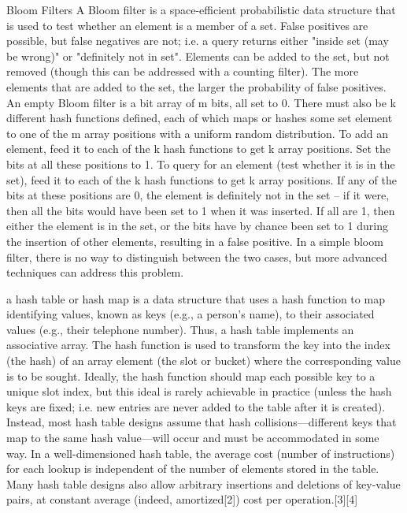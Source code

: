 Bloom Filters
A Bloom filter is a space-efficient probabilistic data structure that is used to test whether an element
is a member of a set. False positives are possible, but false negatives are not; i.e. a query returns either "inside set (may be wrong)"
or "definitely not in set". Elements can be added to the set, but not removed (though this can be addressed with a counting filter).
The more elements that are added to the set, the larger the probability of false positives.
An empty Bloom filter is a bit array of m bits, all set to 0. There must also be k different hash functions defined, each of which maps or hashes some set element to one of the m array positions with a uniform random distribution.
To add an element, feed it to each of the k hash functions to get k array positions. Set the bits at all these positions to 1.
To query for an element (test whether it is in the set), feed it to each of the k hash functions to get k array positions.
If any of the bits at these positions are 0, the element is definitely not in the set – if it were,
then all the bits would have been set to 1 when it was inserted. If all are 1, then either the element
is in the set, or the bits have by chance been set to 1 during the insertion of other elements, resulting
in a false positive. In a simple bloom filter, there is no way to distinguish between the two cases,
but more advanced techniques can address this problem.

a hash table or hash map is a data structure that uses a hash function to map identifying values, known as keys (e.g., a person's name), to their associated values (e.g., their telephone number). Thus, a hash table implements an associative array. The hash function is used to transform the key into the index (the hash) of an array element (the slot or bucket) where the corresponding value is to be sought.
Ideally, the hash function should map each possible key to a unique slot index, but this ideal is rarely achievable in practice (unless the hash keys are fixed; i.e. new entries are never added to the table after it is created). Instead, most hash table designs assume that hash collisions—different keys that map to the same hash value—will occur and must be accommodated in some way.
In a well-dimensioned hash table, the average cost (number of instructions) for each lookup is independent of the number of elements stored in the table. Many hash table designs also allow arbitrary insertions and deletions of key-value pairs, at constant average (indeed, amortized[2]) cost per operation.[3][4]


